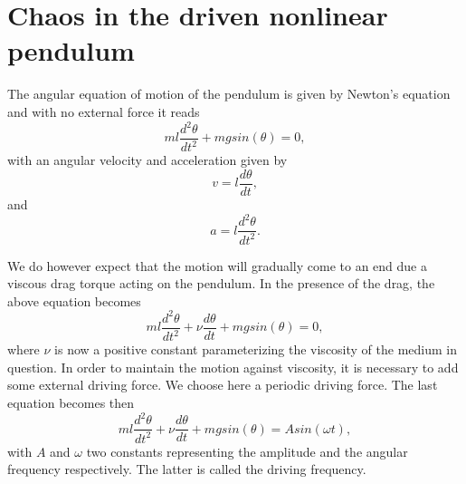 




\section*{Chaos in the driven nonlinear pendulum}

The angular equation of motion of the pendulum is given by
Newton's equation and with no external force it reads 
\begin{equation}
  ml\frac{d^2\theta}{dt^2}+mgsin(\theta)=0,
\end{equation}
with an angular velocity and acceleration given by
\begin{equation}
     v=l\frac{d\theta}{dt},
\end{equation}
and 
\begin{equation}
     a=l\frac{d^2\theta}{dt^2}.
\end{equation}


We do however expect that the motion will gradually come to an end
due a viscous drag torque acting on the pendulum. 
In the presence of the drag, the above equation becomes
\begin{equation}
   ml\frac{d^2\theta}{dt^2}+\nu\frac{d\theta}{dt}  +mgsin(\theta)=0,
\label{eq:pend1}
\end{equation}
where $\nu$ is now a positive constant parameterizing the viscosity
of the medium in question. In order to maintain the motion against
viscosity, it is necessary to add some external driving force. 
We choose here a periodic driving force. The last equation becomes then
\begin{equation}
   ml\frac{d^2\theta}{dt^2}+\nu\frac{d\theta}{dt}  +mgsin(\theta)=Asin(\omega t),
\label{eq:pend2}
\end{equation}
with $A$ and $\omega$ two constants representing the amplitude and 
the angular frequency respectively. The latter is called the driving frequency.



